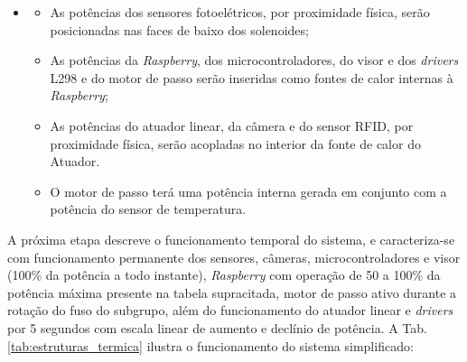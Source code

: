 \begin{itemize}
    \item []
    \begin{itemize}
        \item As potências dos sensores fotoelétricos, por proximidade física, serão posicionadas nas faces de baixo dos solenoides;
        \item As potências da \textit{Raspberry}, dos microcontroladores, do visor e dos \textit{drivers} L298 e do motor de passo serão inseridas como fontes de calor internas à \textit{Raspberry};
        \item As potências do atuador linear, da câmera e do sensor RFID, por proximidade física, serão acopladas no interior da fonte de calor do Atuador. 
        \item O motor de passo terá uma potência interna gerada em conjunto com a potência do sensor de temperatura.
    \end{itemize}
\end{itemize}



A próxima etapa descreve o funcionamento temporal do sistema, e caracteriza-se com funcionamento permanente dos sensores, câmeras, microcontroladores e visor (100\% da potência a todo instante), \textit{Raspberry} com operação de 50 a 100\% da potência máxima presente na tabela supracitada, motor de passo ativo durante a rotação do fuso do subgrupo, além do funcionamento do atuador linear e \textit{drivers} por 5 segundos com escala linear de aumento e declínio de potência. A Tab. \ref{tab:estruturas_termica} ilustra o funcionamento do sistema simplificado:


